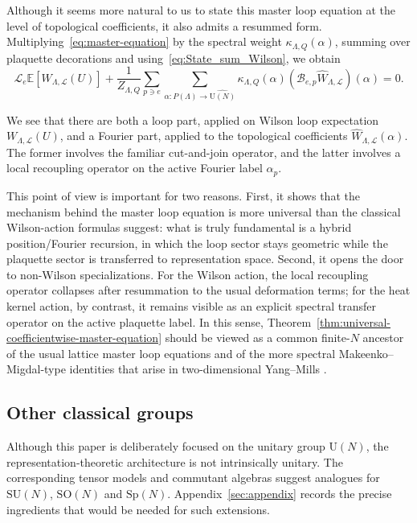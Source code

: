 \documentclass[11pt,a4paper,reqno]{article}
\theoremstyle{definition}
\theoremstyle{remark}
\newcommand\SU{{\mathrm{SU}}}
\newcommand\SO{{\mathrm{SO}}}
\newcommand\Sp{{\mathrm{Sp}}}
\newcommand\U{{\mathrm U}}
\newcommand\Lc{{\mathcal{L}}}
\begin{document}
Although it seems more natural to us to state this master loop equation at the level of topological coefficients, it also admits a resummed form. Multiplying~\eqref{eq:master-equation} by the spectral weight $\kappa_{\Lambda,Q}(\alpha)$, summing over plaquette decorations and using~\eqref{eq:State_sum_Wilson}, we obtain
\begin{equation}
\mathscr L_e \mathbb E[W_{\Lambda,\Lc}(U)]
+\frac1{Z_{\Lambda,Q}}\sum_{p\ni e}\sum_{\alpha:P(\Lambda)\to\widehat{\U(N)}}
\kappa_{\Lambda,Q}(\alpha)(\mathscr B_{e,p}\widehat{W}_{\Lambda,\Lc})(\alpha)=0.
\end{equation}

We see that there are both a loop part, applied on Wilson loop expectation $W_{\Lambda,\Lc}(U)$, and a Fourier part, applied to the topological coefficients $\widehat{W}_{\Lambda,\Lc}(\alpha)$. The former involves the familiar cut-and-join operator, and the latter involves a local recoupling operator on the active Fourier label $\alpha_p$.

This point of view is important for two reasons. First, it shows that the mechanism behind the master loop equation is more universal than the classical Wilson-action formulas suggest: what is truly fundamental is a hybrid position/Fourier recursion, in which the loop sector stays geometric while the plaquette sector is transferred to representation space. Second, it opens the door to non-Wilson specializations. For the Wilson action, the local recoupling operator collapses after resummation to the usual deformation terms; for the heat kernel action, by contrast, it remains visible as an explicit spectral transfer operator on the active plaquette label. In this sense, Theorem~\ref{thm:universal-coefficientwise-master-equation} should be viewed as a common finite-$N$ ancestor of the usual lattice master loop equations and of the more spectral Makeenko--Migdal-type identities that arise in two-dimensional Yang--Mills \cite{SSZ25}.

\subsection{Other classical groups}

Although this paper is deliberately focused on the unitary group $\U(N)$, the representation-theoretic architecture is not intrinsically unitary. The corresponding tensor models and commutant algebras suggest analogues for $\SU(N)$, $\SO(N)$ and $\Sp(N)$. Appendix~\ref{sec:appendix} records the precise ingredients that would be needed for such extensions.
\end{document}
